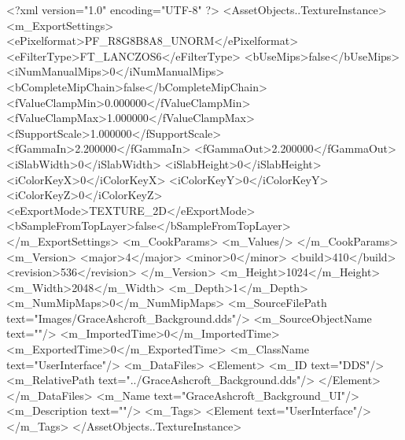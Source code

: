 <?xml version="1.0" encoding="UTF-8" ?>
<AssetObjects..TextureInstance>
	<m_ExportSettings>
		<ePixelformat>PF_R8G8B8A8_UNORM</ePixelformat>
		<eFilterType>FT_LANCZOS6</eFilterType>
		<bUseMips>false</bUseMips>
		<iNumManualMips>0</iNumManualMips>
		<bCompleteMipChain>false</bCompleteMipChain>
		<fValueClampMin>0.000000</fValueClampMin>
		<fValueClampMax>1.000000</fValueClampMax>
		<fSupportScale>1.000000</fSupportScale>
		<fGammaIn>2.200000</fGammaIn>
		<fGammaOut>2.200000</fGammaOut>
		<iSlabWidth>0</iSlabWidth>
		<iSlabHeight>0</iSlabHeight>
		<iColorKeyX>0</iColorKeyX>
		<iColorKeyY>0</iColorKeyY>
		<iColorKeyZ>0</iColorKeyZ>
		<eExportMode>TEXTURE_2D</eExportMode>
		<bSampleFromTopLayer>false</bSampleFromTopLayer>
	</m_ExportSettings>
	<m_CookParams>
		<m_Values/>
	</m_CookParams>
	<m_Version>
		<major>4</major>
		<minor>0</minor>
		<build>410</build>
		<revision>536</revision>
	</m_Version>
	<m_Height>1024</m_Height>
	<m_Width>2048</m_Width>
	<m_Depth>1</m_Depth>
	<m_NumMipMaps>0</m_NumMipMaps>
	<m_SourceFilePath text="Images/GraceAshcroft_Background.dds"/>
	<m_SourceObjectName text=""/>
	<m_ImportedTime>0</m_ImportedTime>
	<m_ExportedTime>0</m_ExportedTime>
	<m_ClassName text="UserInterface"/>
	<m_DataFiles>
		<Element>
			<m_ID text="DDS"/>
			<m_RelativePath text="../GraceAshcroft_Background.dds"/>
		</Element>
	</m_DataFiles>
	<m_Name text="GraceAshcroft_Background_UI"/>
	<m_Description text=""/>
	<m_Tags>
		<Element text="UserInterface"/>
	</m_Tags>
</AssetObjects..TextureInstance>
